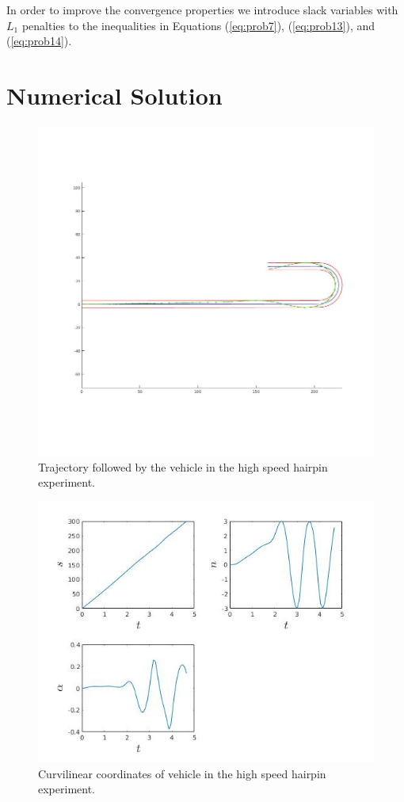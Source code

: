 \documentclass[conference,11pt]{IEEEtran}
\begin{document}
In order to improve the convergence properties we introduce slack variables
with $L_1$ penalties to the inequalities in Equations (\ref{eq:prob7}), (\ref{eq:prob13}), and (\ref{eq:prob14}).

\section{Numerical Solution}
\begin{figure}[t]
  \centering
  \includegraphics[scale=0.25]{hairpin_brake.jpg}
  \caption{Trajectory followed by the vehicle in the high speed hairpin experiment.}
  \label{fig:cg}
\end{figure}
\begin{figure}[b]
  \centering
  \includegraphics[scale=0.5]{hairpin_brake_curv.jpg}
  \caption{Curvilinear coordinates of vehicle in the high speed hairpin experiment.}
  \label{fig:cg}
\end{figure}
\end{document}
